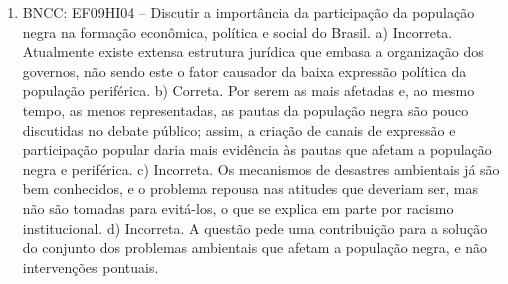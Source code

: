 \begin{enumerate}
\item
BNCC: EF09HI04 -- Discutir a importância da participação da
população negra na formação econômica, política e social do Brasil. a) Incorreta. Atualmente existe extensa estrutura jurídica que embasa a organização dos governos, não sendo este o fator causador da baixa expressão política da população periférica. b) Correta. Por serem as mais afetadas e, ao mesmo tempo, as menos representadas, as pautas da população negra são pouco discutidas no debate público; assim, a criação de canais de expressão e participação popular daria mais evidência às pautas que afetam a população negra e periférica. c) Incorreta. Os mecanismos de desastres ambientais já são bem conhecidos, e o problema repousa nas atitudes que deveriam ser, mas não são tomadas para evitá-los, o que se explica em parte por racismo institucional. d) Incorreta. A questão pede uma contribuição para a solução do conjunto dos problemas ambientais que afetam a população negra, e não intervenções pontuais.
\end{enumerate}


